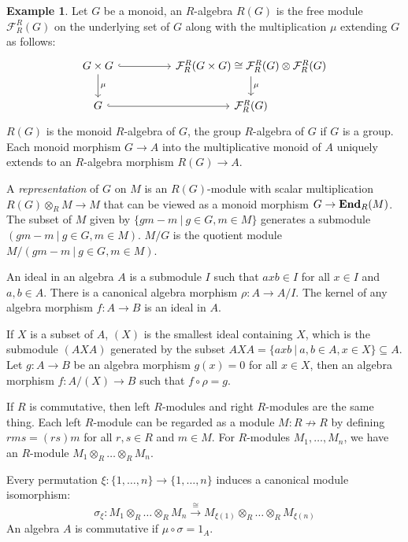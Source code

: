 \documentclass[8pt]{article}
\theoremstyle{definition}
\theoremstyle{definition}
\theoremstyle{definition}
\theoremstyle{definition}
\theoremstyle{definition}
\theoremstyle{definition}
\theoremstyle{definition}
\theoremstyle{definition}
\theoremstyle{definition}
\theoremstyle{definition}
\theoremstyle{definition}
\theoremstyle{definition}
\newtheorem{example}{Example}[section]
\theoremstyle{definition}
\theoremstyle{definition}
\theoremstyle{question}
\begin{document}
\begin{example}
  Let $G$ be a monoid, an $R$-algebra $R(G)$ is the free module
  $\mathcal{F}^R_R(G)$ on the underlying set of $G$ along with 
  the multiplication $\mu$ extending $G$ as follows:
  \[
  \begin{tikzcd}
    G \times G \ar[d, "\mu"] \ar[rr, hookrightarrow] && \mathcal{F}^R_R(G \times G) \cong \mathcal{F}^R_R(G) \otimes \mathcal{F}^R_R(G) \ar[d, "\mu"] \\
    G \ar[rr, hookrightarrow]  && \mathcal{F}^R_R(G)
  \end{tikzcd}
  \]
  $R(G)$ is the monoid $R$-algebra of $G$, the group $R$-algebra of $G$ if $G$ is a group.
  Each monoid morphism $G \to A$ into the multiplicative monoid of $A$
  uniquely extends to an $R$-algebra morphism $R(G) \to A$.

  A \emph{representation} of $G$ on $M$ is an $R(G)$-module with scalar
  multiplication $R(G) \otimes_R M \to M$ that can be viewed
  as a monoid morphism $G \to {\bf End}_R(M)$.
  The subset of $M$ given by $\{ gm - m \: | \: g \in G, m \in M \}$
  generates a submodule $(gm - m \: | \: g \in G, m \in M)$. 
  $M/G$ is the quotient module $M/(gm - m \: | \: g \in G, m \in M)$.
\end{example}

An ideal in an algebra $A$ is a submodule $I$ such that $a x b \in I$ for all $x \in I$
and $a, b \in A$. There is a canonical algebra morphism $\rho : A \to A/I$. The kernel of any
algebra morphism $f : A \to B$ is an ideal in $A$.

If $X$ is a subset of $A$, $(X)$ is the smallest ideal containing $X$, which is the submodule 
$(A X A)$ generated by the subset $A X A = \{ a x b \: | \: a, b \in A, x \in X \} \subseteq A$.
Let $g : A \to B$ be an algebra morphism $g(x) = 0$ for all $x \in X$, then an algebra morphism
$f : A/(X) \to B$ such that $f \circ \rho = g$.

If $R$ is commutative, then left $R$-modules and right $R$-modules are the same thing.
Each left $R$-module can be regarded as a module $M : R \not\to R$ by defining
$r m s = (r s) m$ for all $r, s \in R$ and $m \in M$. For $R$-modules $M_1, \ldots, M_n$,
we have an $R$-module $M_1 \otimes_R \ldots \otimes_R M_n$.

Every permutation $\xi : \{ 1, \ldots, n \} \to \{ 1, \ldots, n \}$ induces a canonical module isomorphism:
\[
\sigma_{\xi} : M_1 \otimes_R \ldots \otimes_R M_n \xrightarrow{\cong} M_{\xi(1)} \otimes_R \ldots \otimes_R M_{\xi(n)}
\]
An algebra $A$ is commutative if $\mu \circ \sigma = 1_A$.
\end{document}
